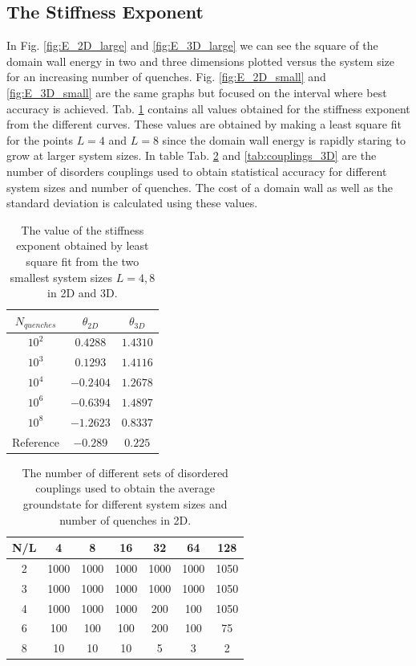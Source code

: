\documentclass[paper=a4, fontsize=11pt]{scrartcl} %
\numberwithin{equation}{section} %
\numberwithin{figure}{section} %
\numberwithin{table}{section} %
\begin{document}
\subsection{The Stiffness Exponent}
In Fig. \ref{fig:E_2D_large} and \ref{fig:E_3D_large} we can see the square of the domain wall energy in two and three dimensions plotted versus the system size for an increasing number of quenches. Fig. \ref{fig:E_2D_small} and \ref{fig:E_3D_small} are the same graphs but focused on the interval where best accuracy is achieved. Tab. \ref{tab:stiffness_exponent} contains all values obtained for the stiffness exponent from the different curves. These values are obtained by making a least square fit for the points $L=4$ and $L=8$ since the domain wall energy is rapidly staring to grow at larger system sizes. In table Tab. \ref{tab:couplings_2D} and \ref{tab:couplings_3D} are the number of disorders couplings used to obtain statistical accuracy for different system sizes and number of quenches. The cost of a domain wall as well as the standard deviation is calculated using these values.

\begin{table}[h]
\label{tab:stiffness_exponent}
\centering
  \begin{tabular}{| c | c | c |}
    \hline
    $N_{quenches}$ & $\theta_{2D}$ & $\theta_{3D}$ \\ \hline
    $10^2$ & $0.4288$ & $1.4310$ \\ \hline
    $10^3$ & $0.1293$ & $1.4116$ \\ \hline
    $10^4$ & $-0.2404$ & $1.2678$ \\ \hline
    $10^6$ & $-0.6394$ & $1.4897$ \\ \hline
    $10^8$ & $-1.2623$ & $0.8337$ \\ \hline
    Reference & $-0.289$ & $0.225$ \\ \hline
  \end{tabular}
  \caption{The value of the stiffness exponent obtained by least square fit from the two smallest system sizes $L=4,8$ in 2D and 3D.}
\end{table}

\begin{table}[h]
\label{tab:couplings_2D}
\centering
  \begin{tabular}{| c | c | c | c | c | c | c |}
    \hline
    N/L & 4 & 8 & 16 & 32 & 64 & 128 \\ \hline
	2 & 1000 & 1000 & 1000 & 1000 & 1000 & 1050 \\ \hline
	3 & 1000 & 1000 & 1000 & 1000 & 1000 & 1050 \\ \hline
	4 & 1000 & 1000 & 1000 & 200 & 100 & 1050 \\ \hline
	6 & 100 & 100 & 100 & 200 & 100 & 75 \\ \hline
	8 & 10 & 10 & 10 & 5 & 3 & 2 \\ \hline
  \end{tabular}
  \caption{The number of different sets of disordered couplings used to obtain the average groundstate for different system sizes and number of quenches in 2D.}
\end{table}
\end{document}

